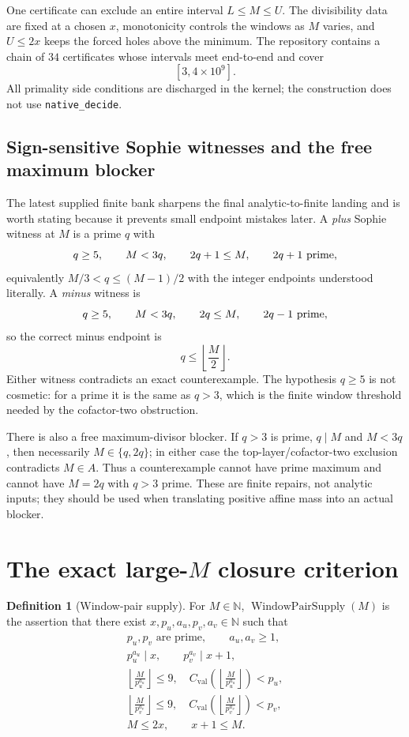 \documentclass[11pt]{article}
\theoremstyle{definition}
\newtheorem{definition}[theorem]{Definition}
\newcommand{\N}{\mathbb N}
\newcommand{\1}{\mathbf 1}
\newcommand{\WPS}{\operatorname{WindowPairSupply}}
\begin{document}
One certificate can exclude an entire interval $L\le M\le U$.  The divisibility data are
fixed at a chosen $x$, monotonicity controls the windows as $M$ varies, and $U\le2x$
keeps the forced holes above the minimum.  The repository contains a chain of $34$
certificates whose intervals meet end-to-end and cover
\[
[3,4\times10^9].
\]
All primality side conditions are discharged in the kernel; the construction does not use
\texttt{native\_decide}.


\subsection{Sign-sensitive Sophie witnesses and the free maximum blocker}

The latest supplied finite bank sharpens the final analytic-to-finite landing and is worth stating because it
prevents small endpoint mistakes later.  A \emph{plus} Sophie witness at $M$ is a prime $q$ with
\[
 q\ge5,\qquad M<3q,\qquad 2q+1\le M,\qquad 2q+1\ \hbox{prime},
\]
equivalently $M/3<q\le (M-1)/2$ with the integer endpoints understood literally.  A \emph{minus} witness is
\[
 q\ge5,\qquad M<3q,\qquad 2q\le M,\qquad 2q-1\ \hbox{prime},
\]
so the correct minus endpoint is
\[
 \boxed{q\le\left\lfloor\frac M2\right\rfloor.}
\]
Either witness contradicts an exact counterexample.  The hypothesis $q\ge5$ is not cosmetic: for a prime it is
the same as $q>3$, which is the finite window threshold needed by the cofactor-two obstruction.

There is also a free maximum-divisor blocker.  If $q>3$ is prime, $q\mid M$ and $M<3q$, then necessarily
$M\in\{q,2q\}$; in either case the top-layer/cofactor-two exclusion contradicts $M\in A$.  Thus a counterexample
cannot have prime maximum and cannot have $M=2q$ with $q>3$ prime.  These are finite repairs, not analytic
inputs; they should be used when translating positive affine mass into an actual blocker.

\section{The exact large-$M$ closure criterion}

\begin{definition}[Window-pair supply]
For $M\in\N$, $\WPS(M)$ is the assertion that there exist
$x,p_u,a_u,p_v,a_v\in\N$ such that
\[
\begin{gathered}
p_u,p_v\text{ are prime},\qquad a_u,a_v\ge1,\\
p_u^{a_u}\mid x,\qquad p_v^{a_v}\mid x+1,\\
\left\lfloor\frac M{p_u^{a_u}}\right\rfloor\le9,
\quad C_{\mathrm{val}}\!\left(\left\lfloor\frac M{p_u^{a_u}}\right\rfloor\right)<p_u,\\
\left\lfloor\frac M{p_v^{a_v}}\right\rfloor\le9,
\quad C_{\mathrm{val}}\!\left(\left\lfloor\frac M{p_v^{a_v}}\right\rfloor\right)<p_v,\\
M\le2x,
\qquad x+1\le M.
\end{gathered}
\]
\end{definition}
\end{document}
